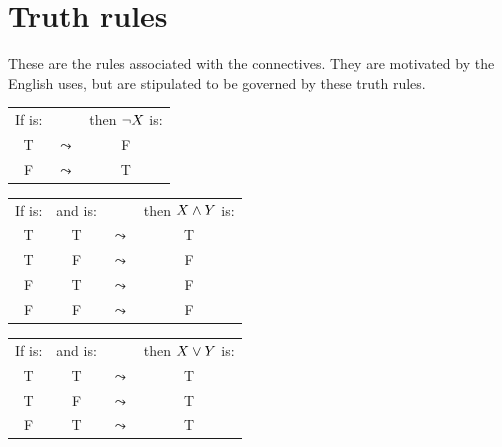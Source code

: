 \section{Truth rules}\label{sec:Truth rules}
These are the rules associated with the connectives. They are motivated by the English uses, but are stipulated to be governed by these truth rules. 
\begin{highlighted}\label{def:Truthint}
		\begin{center}
			\begin{tabular}{ccc}
				If \metaX is:&&then $\neg X$ is:\\
				T &$\leadsto$& F\\
				F &$\leadsto$& T
			\end{tabular}
		\end{center}
		\begin{center}
			\begin{tabular}{cccc}
				If \metaX is:&and \metaY is:&&then $X\mathbin{\wedge}Y$ is:\\
				T & T &$\leadsto$& T\\
				T & F &$\leadsto$& F\\
				F & T &$\leadsto$& F\\
				F & F &$\leadsto$& F
			\end{tabular}
		\end{center}
		\begin{center}
			\begin{tabular}{cccc}
				If \metaX is:&and \metaY is:&&then $X\vee Y$ is:\\
				T & T &$\leadsto$& T\\
				T & F &$\leadsto$& T\\
				F & T &$\leadsto$& T\\

\end{tabular}
\end{center}
\end{highlighted}
